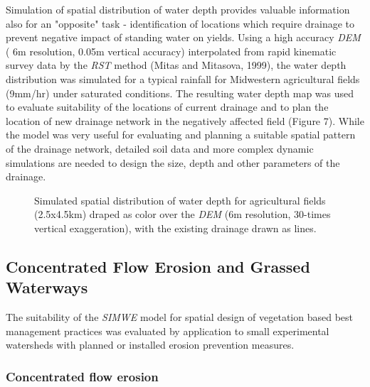 \documentclass{kapedbk} %
\begin{document}
\medskip
Simulation of spatial distribution of water depth provides valuable
information also for an "opposite" task - identification of locations which
require drainage to prevent negative impact of standing water on yields.
Using a high accuracy {\sl DEM}
( 6m resolution, 0.05m vertical accuracy) interpolated from
rapid kinematic survey data by the {\sl RST} method (Mitas and Mitasova, 1999),
the water depth distribution was simulated for a typical
rainfall for Midwestern agricultural fields (9mm/hr)
under saturated conditions. The resulting water depth map
was used to evaluate suitability of the locations of current drainage
and to plan the location
of new drainage network in the negatively affected field (Figure 7).
While the model was very useful for evaluating and planning
a suitable spatial pattern of the drainage network,
detailed soil data and
more complex dynamic simulations are needed to design the size, depth
and other parameters of the drainage.

\begin{figure}[h]
\centerline{}
\caption{ Simulated spatial distribution of water depth
for agricultural fields (2.5x4.5km) draped
as color over the {\sl DEM} (6m resolution,
30-times vertical exaggeration), with the existing drainage drawn as lines.}
\end{figure}

\bigskip \medskip \noindent
\subsection{Concentrated Flow Erosion and Grassed Waterways}

\medskip
The suitability of the {\sl SIMWE} model
for spatial design of vegetation based best management practices
was evaluated by application to small experimental watersheds
with planned or installed erosion prevention measures.

\medskip\noindent
\subsubsection{Concentrated flow erosion} 

\quad
\end{document}
